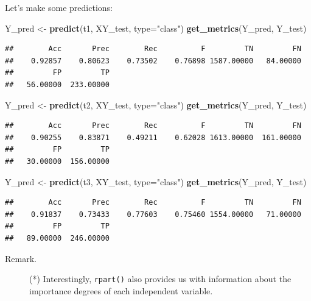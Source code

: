 \documentclass[10pt,b5paper,krantz1]{krantz}
\newenvironment{Shaded}{\begin{snugshade}}{\end{snugshade}}
\newcommand{\DataTypeTok}[1]{\textcolor[rgb]{0.27,0.27,0.27}{#1}}
\newcommand{\KeywordTok}[1]{\textcolor[rgb]{0.27,0.27,0.27}{\textbf{#1}}}
\newcommand{\NormalTok}[1]{#1}
\newcommand{\StringTok}[1]{\textcolor[rgb]{0.5,0.5,0.5}{#1}}
\begin{document}
Let's make some predictions:

\begin{Shaded}
\begin{Highlighting}[]
\NormalTok{Y_pred <-}\StringTok{ }\KeywordTok{predict}\NormalTok{(t1, XY_test, }\DataTypeTok{type=}\StringTok{"class"}\NormalTok{)}
\KeywordTok{get_metrics}\NormalTok{(Y_pred, Y_test)}
\end{Highlighting}
\end{Shaded}

\begin{verbatim}
##        Acc       Prec        Rec          F         TN         FN 
##    0.92857    0.80623    0.73502    0.76898 1587.00000   84.00000 
##         FP         TP 
##   56.00000  233.00000
\end{verbatim}

\begin{Shaded}
\begin{Highlighting}[]
\NormalTok{Y_pred <-}\StringTok{ }\KeywordTok{predict}\NormalTok{(t2, XY_test, }\DataTypeTok{type=}\StringTok{"class"}\NormalTok{)}
\KeywordTok{get_metrics}\NormalTok{(Y_pred, Y_test)}
\end{Highlighting}
\end{Shaded}

\begin{verbatim}
##        Acc       Prec        Rec          F         TN         FN 
##    0.90255    0.83871    0.49211    0.62028 1613.00000  161.00000 
##         FP         TP 
##   30.00000  156.00000
\end{verbatim}

\begin{Shaded}
\begin{Highlighting}[]
\NormalTok{Y_pred <-}\StringTok{ }\KeywordTok{predict}\NormalTok{(t3, XY_test, }\DataTypeTok{type=}\StringTok{"class"}\NormalTok{)}
\KeywordTok{get_metrics}\NormalTok{(Y_pred, Y_test)}
\end{Highlighting}
\end{Shaded}

\begin{verbatim}
##        Acc       Prec        Rec          F         TN         FN 
##    0.91837    0.73433    0.77603    0.75460 1554.00000   71.00000 
##         FP         TP 
##   89.00000  246.00000
\end{verbatim}

\begin{description}
\item[Remark.]
(*) Interestingly, \texttt{rpart()} also provides us with information
about the importance degrees of each independent variable.
\end{description}
\end{document}
